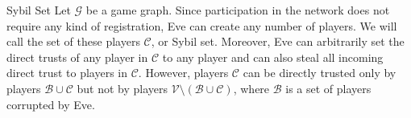 {}
\begin{definitiongr}{Sybil Set}
  Let $\mathcal{G}$ be a game graph. Since participation in the network does not require any kind of registration, Eve
  can create any number of players. We will call the set of these players $\mathcal{C}$, or Sybil set. Moreover, Eve
  can arbitrarily set the direct trusts of any player in $\mathcal{C}$ to any player and can also steal all
  incoming direct trust to players in $\mathcal{C}$. However, players $\mathcal{C}$ can be directly trusted only by
  players $\mathcal{B} \cup \mathcal{C}$ but not by players $\mathcal{V} \setminus (\mathcal{B} \cup \mathcal{C})$,
  where $\mathcal{B}$ is a set of players corrupted by Eve.
\end{definitiongr}
